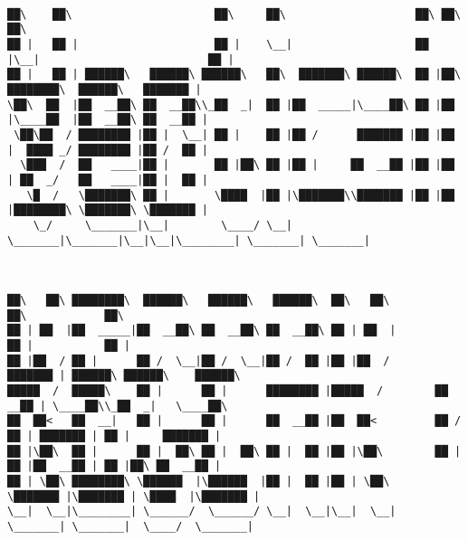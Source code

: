 \documentclass[varwidth=\maxdimen,margin=0.5cm,multi={verbatim}]{standalone}
\begin{document}
\begin{verbatim}

██\    ██\                      ██\     ██\                    ██\ ██\                           ██\
██ |   ██ |                     ██ |    \__|                   ██ |\__|                          ██ |
██ |   ██ | ██████\   ██████\ ██████\   ██\  ███████\ ██████\  ██ |██\ ████████\  ██████\   ███████ |
\██\  ██  |██  __██\ ██  __██\\_██  _|  ██ |██  _____|\____██\ ██ |██ |\____██  |██  __██\ ██  __██ |
 \██\██  / ████████ |██ |  \__| ██ |    ██ |██ /      ███████ |██ |██ |  ████ _/ ████████ |██ /  ██ |
  \███  /  ██   ____|██ |       ██ |██\ ██ |██ |     ██  __██ |██ |██ | ██  _/   ██   ____|██ |  ██ |
   \█  /   \███████\ ██ |       \████  |██ |\███████\\███████ |██ |██ |████████\ \███████\ \███████ |
    \_/     \_______|\__|        \____/ \__| \_______|\_______|\__|\__|\________| \_______| \_______|



██\   ██\ ████████\  ██████\   ██████\   ██████\  ██\   ██\             ██\            ██\
██ | ██  |██  _____|██  __██\ ██  __██\ ██  __██\ ██ | ██  |            ██ |           ██ |
██ |██  / ██ |      ██ /  \__|██ /  \__|██ /  ██ |██ |██  /        ███████ | ██████\ ██████\    ██████\
█████  /  █████\    ██ |      ██ |      ████████ |█████  /        ██  __██ | \____██\\_██  _|   \____██\
██  ██<   ██  __|   ██ |      ██ |      ██  __██ |██  ██<         ██ /  ██ | ███████ | ██ |     ███████ |
██ |\██\  ██ |      ██ |  ██\ ██ |  ██\ ██ |  ██ |██ |\██\        ██ |  ██ |██  __██ | ██ |██\ ██  __██ |
██ | \██\ ████████\ \██████  |\██████  |██ |  ██ |██ | \██\       \███████ |\███████ | \████  |\███████ |
\__|  \__|\________| \______/  \______/ \__|  \__|\__|  \__|       \_______| \_______|  \____/  \_______|




\end{verbatim}
\end{document}
